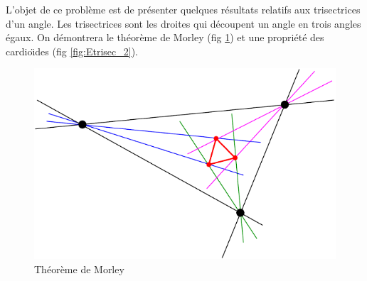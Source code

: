 L'objet de ce probl{\`e}me est de pr{\'e}senter quelques r{\'e}sultats relatifs aux trisectrices d'un angle. Les
trisectrices sont les droites qui d{\'e}coupent un angle en trois angles {\'e}gaux. On d{\'e}montrera le th{\'e}or{\`e}me de Morley (fig \ref{fig:Etrisec_1}) et une propri{\'e}t{\'e} des cardio{\"\i}des (fig \ref{fig:Etrisec_2}).

\begin{figure}[ht]
  \centering
  \includegraphics{Etrisec_1.pdf}
  \caption{Th{\'e}or{\`e}me de Morley}
  \label{fig:Etrisec_1}
\end{figure}


